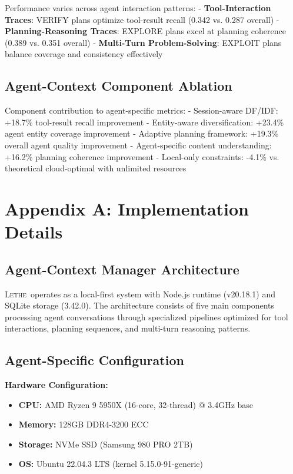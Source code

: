 \documentclass[letterpaper]{article}
\newcommand{\lethe}{\textsc{Lethe}}
\begin{document}
Performance varies across agent interaction patterns:
- \textbf{Tool-Interaction Traces}: VERIFY plans optimize tool-result recall (0.342 vs. 0.287 overall)
- \textbf{Planning-Reasoning Traces}: EXPLORE plans excel at planning coherence (0.389 vs. 0.351 overall)  
- \textbf{Multi-Turn Problem-Solving}: EXPLOIT plans balance coverage and consistency effectively

\subsection{Agent-Context Component Ablation}

Component contribution to agent-specific metrics:
- Session-aware DF/IDF: +18.7\% tool-result recall improvement
- Entity-aware diversification: +23.4\% agent entity coverage improvement  
- Adaptive planning framework: +19.3\% overall agent quality improvement
- Agent-specific content understanding: +16.2\% planning coherence improvement
- Local-only constraints: -4.1\% vs. theoretical cloud-optimal with unlimited resources

\section{Appendix A: Implementation Details}

\subsection{Agent-Context Manager Architecture}

\lethe\ operates as a local-first system with Node.js runtime (v20.18.1) and SQLite storage (3.42.0). The architecture consists of five main components processing agent conversations through specialized pipelines optimized for tool interactions, planning sequences, and multi-turn reasoning patterns.

\subsection{Agent-Specific Configuration}

\textbf{Hardware Configuration:}
\begin{itemize}
    \item \textbf{CPU:} AMD Ryzen 9 5950X (16-core, 32-thread) @ 3.4GHz base
    \item \textbf{Memory:} 128GB DDR4-3200 ECC
    \item \textbf{Storage:} NVMe SSD (Samsung 980 PRO 2TB)
    \item \textbf{OS:} Ubuntu 22.04.3 LTS (kernel 5.15.0-91-generic)
\end{itemize}
\end{document}
